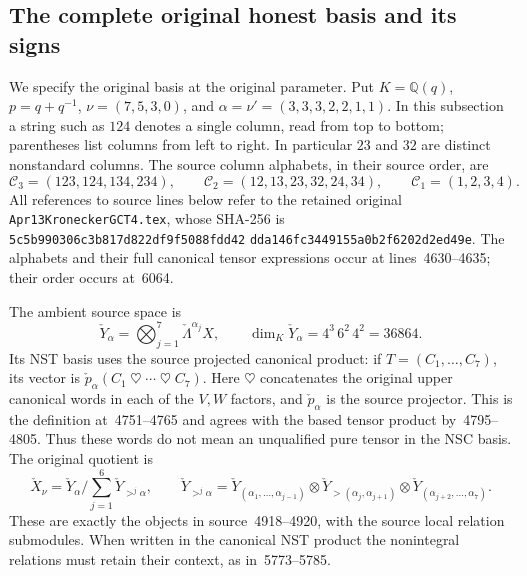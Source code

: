 \subsection{The complete original honest basis and its signs}
\label{fullbasis:enumeration}

We specify the original basis at the original parameter.  Put
$K=\mathbb Q(q)$, $p=q+q^{-1}$, $\nu=(7,5,3,0)$, and
$\alpha=\nu'=(3,3,3,2,2,1,1)$.  In this subsection a string such as
$124$ denotes a single column, read from top to bottom; parentheses list
columns from left to right.  In particular $23$ and $32$ are distinct
nonstandard columns.  The source column alphabets, in their source order,
are
\[
\mathcal C_3=(123,124,134,234),\qquad
\mathcal C_2=(12,13,23,32,24,34),\qquad
\mathcal C_1=(1,2,3,4).
\]
All references to source lines below refer to the retained original
\texttt{Apr13KroneckerGCT4.tex}, whose SHA-256 is
\texttt{5c5b990306c3b817d822df9f5088fdd42}\allowbreak
\texttt{dda146fc3449155a0b2f6202d2ed49e}.
The alphabets and their full canonical tensor expressions occur at
lines~4630--4635; their order occurs at~6064.

The ambient source space is
\[
\check Y_\alpha=
 \bigotimes_{j=1}^{7}\check\Lambda^{\alpha_j}X,
\qquad \dim_K\check Y_\alpha=4^3\,6^2\,4^2=36864.
\]
Its NST basis uses the source projected canonical product: if
$T=(C_1,\ldots,C_7)$, its vector is
$\check p_\alpha(C_1\mathbin\heartsuit\cdots\mathbin\heartsuit C_7)$.
Here $\heartsuit$ concatenates the original upper canonical words in each
of the $V,W$ factors, and $\check p_\alpha$ is the source projector.
This is the definition at~4751--4765 and agrees with the based tensor
product by~4795--4805.  Thus these words do not mean an unqualified pure
tensor in the NSC basis.  The original quotient is
\[
 \check X_\nu=\check Y_\alpha/\sum_{j=1}^{6}\check Y_{>^j\alpha},
 \qquad
 \check Y_{>^j\alpha}=
 \check Y_{(\alpha_1,\ldots,\alpha_{j-1})}\otimes
 \check Y_{>(\alpha_j,\alpha_{j+1})}\otimes
 \check Y_{(\alpha_{j+2},\ldots,\alpha_7)}.
\]
These are exactly the objects in source~4918--4920, with the source local
relation submodules.  When written in the canonical NST product the
nonintegral relations must retain their context, as in~5773--5785.

